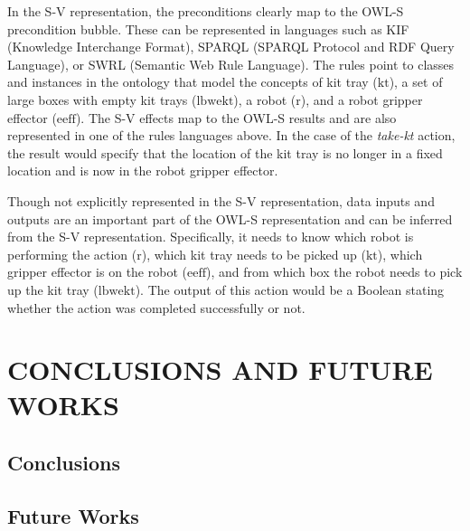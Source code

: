 \documentclass[a4paper, 10pt, conference]{ieeeconf}      %
\begin{document}
In the S-V representation, the preconditions clearly map to the OWL-S precondition bubble. These can be represented in languages such as KIF (Knowledge Interchange Format), SPARQL (SPARQL Protocol and RDF Query Language), or SWRL (Semantic Web Rule Language). The rules point to classes and instances in the ontology that model the concepts of kit tray ($\mathrm{kt}$), a set of large boxes with empty kit trays ($\mathrm{lbwekt}$), a robot ($\mathrm{r}$), and a robot gripper effector ($\mathrm{eeff}$). The S-V effects map to the OWL-S results and are also represented in one of the rules languages above. In the case of the \textsl{take-kt} action, the result would specify that the location of the kit tray is no longer in a fixed location and is now in the robot gripper effector.

Though not explicitly represented in the S-V representation, data inputs and outputs are an important part of the OWL-S representation and can be inferred from the S-V representation. Specifically, it needs to know which robot is performing the action ($\mathrm{r}$), which kit tray needs to be picked up ($\mathrm{kt}$), which gripper effector is on the robot ($\mathrm{eeff}$), and from which box the robot needs to pick up the kit tray ($\mathrm{lbwekt}$). The output of this action would be a Boolean stating whether the action was completed successfully or not.


\section{CONCLUSIONS AND FUTURE WORKS}
\label{sect:Conclusions}

\subsection{Conclusions}




\subsection{Future Works}



\end{document}
